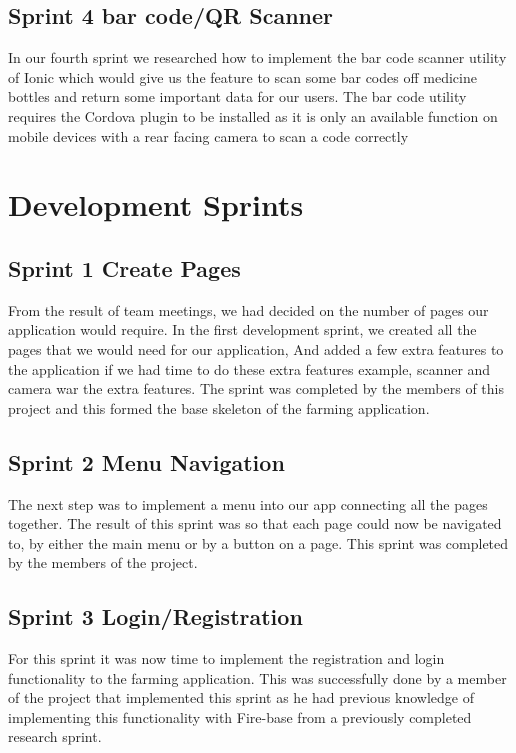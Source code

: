 \documentclass[12pt,a4paper,oneside,openany]{book}
\begin{document}
\subsection{Sprint 4 bar code/QR Scanner}
In our fourth sprint we researched how to implement the bar code scanner utility of Ionic which would give us the feature to scan some bar codes off medicine bottles and return some important data for our users. The bar code utility requires the Cordova plugin to be installed as it is only an available function on mobile devices with a rear facing camera to scan a code correctly

\section{Development Sprints}\label{development_sprints}

\subsection{Sprint 1 Create Pages}
From the result of team meetings, we had decided on the number of pages our application would require. In the first development sprint, we created all the pages that we would need for our application, And added a few extra features to the application if we had time to do these extra features example, scanner and camera war the extra features. The sprint was completed by the members of this project and this formed the base skeleton of the farming application.

\subsection{Sprint 2 Menu Navigation}
The next step was to implement a menu into our app connecting all the pages together. The result of this sprint was so that each page could now be navigated to, by either the main menu or by a button on a page. This sprint was completed by the members of the project.

\subsection{Sprint 3 Login/Registration}
For this sprint it was now time to implement the registration and login functionality to the farming application. This was successfully done by a member of the project that implemented this sprint as he had previous knowledge of implementing this functionality with Fire-base from a previously completed research sprint.
\end{document}
